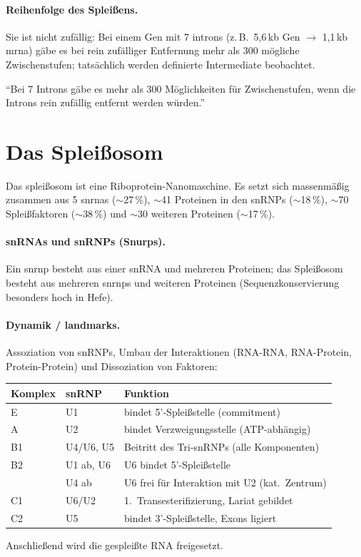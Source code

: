 \paragraph{Reihenfolge des Spleißens.} Sie ist nicht zufällig: Bei einem Gen mit
7 \gls{intron}s (z.\,B.\ 5,6\,kb Gen $\to$ 1,1\,kb \gls{mrna}) gäbe es bei rein
zufälliger Entfernung mehr als 300 mögliche Zwischenstufen; tatsächlich werden
definierte Intermediate beobachtet.

``Bei 7 Introns gäbe es mehr als 300
Möglichkeiten für Zwischenstufen,
wenn die Introns rein zufällig
entfernt werden würden.''


\section{Das Spleißosom}\label{sec:das-spleiosom}
Das \gls{spleißosom} ist eine Riboprotein-Nanomaschine.
Es setzt sich
massenmäßig zusammen aus 5 \gls{snrna}s ($\sim$27\,\%), $\sim$41 Proteinen in
den snRNPs ($\sim$18\,\%), $\sim$70 Spleißfaktoren ($\sim$38\,\%) und $\sim$30
weiteren Proteinen ($\sim$17\,\%).

\paragraph{snRNAs und snRNPs (Snurps).} Ein \gls{snrnp} besteht aus
einer snRNA und mehreren Proteinen; das Spleißosom besteht aus mehreren
\gls{snrnp}s und weiteren Proteinen (Sequenzkonservierung besonders hoch in
Hefe).

\paragraph{Dynamik / landmarks.} Assoziation von snRNPs, Umbau der
Interaktionen (RNA-RNA, RNA-Protein, Protein-Protein) und Dissoziation von
Faktoren:
\begin{center}
    \begin{tabular}{lll}
        \hline
        Komplex & snRNP & Funktion \\
        \hline
        E & U1 & bindet 5'-Spleißstelle (commitment) \\
        A & U2 & bindet Verzweigungsstelle (ATP-abhängig) \\
        B1 & U4/U6, U5 & Beitritt des Tri-snRNPs (alle Komponenten) \\
        B2 & U1 ab, U6 & U6 bindet 5'-Spleißstelle \\
        & U4 ab & U6 frei für Interaktion mit U2 (kat.\ Zentrum) \\
        C1 & U6/U2 & 1.\ Transesterifizierung, Lariat gebildet \\
        C2 & U5 & bindet 3'-Spleißstelle, Exons ligiert \\
        \hline
    \end{tabular}
\end{center}
Anschließend wird die gespleißte RNA freigesetzt.

